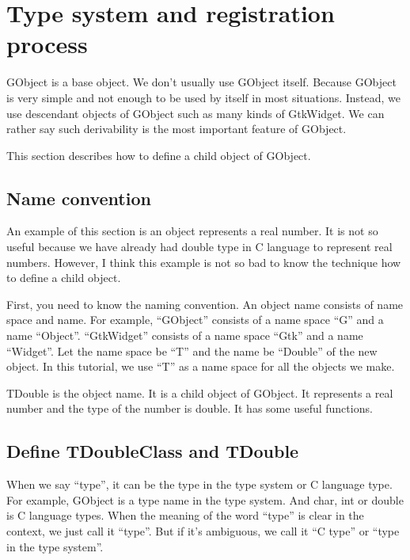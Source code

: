 \section{Type system and registration
process}\label{type-system-and-registration-process}

GObject is a base object. We don't usually use GObject itself. Because
GObject is very simple and not enough to be used by itself in most
situations. Instead, we use descendant objects of GObject such as many
kinds of GtkWidget. We can rather say such derivability is the most
important feature of GObject.

This section describes how to define a child object of GObject.

\subsection{Name convention}\label{name-convention}

An example of this section is an object represents a real number. It is
not so useful because we have already had double type in C language to
represent real numbers. However, I think this example is not so bad to
know the technique how to define a child object.

First, you need to know the naming convention. An object name consists
of name space and name. For example, ``GObject'' consists of a name
space ``G'' and a name ``Object''. ``GtkWidget'' consists of a name
space ``Gtk'' and a name ``Widget''. Let the name space be ``T'' and the
name be ``Double'' of the new object. In this tutorial, we use ``T'' as
a name space for all the objects we make.

TDouble is the object name. It is a child object of GObject. It
represents a real number and the type of the number is double. It has
some useful functions.

\subsection{Define TDoubleClass and
TDouble}\label{define-tdoubleclass-and-tdouble}

When we say ``type'', it can be the type in the type system or C
language type. For example, GObject is a type name in the type system.
And char, int or double is C language types. When the meaning of the
word ``type'' is clear in the context, we just call it ``type''. But if
it's ambiguous, we call it ``C type'' or ``type in the type system''.

